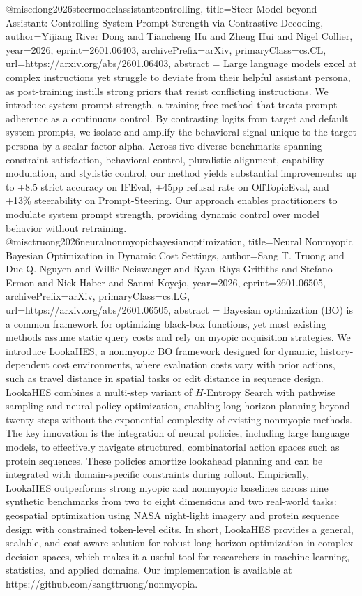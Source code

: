 {}@misc{dong2026steermodelassistantcontrolling,
      title={Steer Model beyond Assistant: Controlling System Prompt Strength via Contrastive Decoding}, 
      author={Yijiang River Dong and Tiancheng Hu and Zheng Hui and Nigel Collier},
      year={2026},
      eprint={2601.06403},
      archivePrefix={arXiv},
      primaryClass={cs.CL},
      url={https://arxiv.org/abs/2601.06403},
      abstract = {Large language models excel at complex instructions yet struggle to deviate from their helpful assistant persona, as post-training instills strong priors that resist conflicting instructions. We introduce system prompt strength, a training-free method that treats prompt adherence as a continuous control. By contrasting logits from target and default system prompts, we isolate and amplify the behavioral signal unique to the target persona by a scalar factor alpha. Across five diverse benchmarks spanning constraint satisfaction, behavioral control, pluralistic alignment, capability modulation, and stylistic control, our method yields substantial improvements: up to +8.5 strict accuracy on IFEval, +45pp refusal rate on OffTopicEval, and +13\% steerability on Prompt-Steering. Our approach enables practitioners to modulate system prompt strength, providing dynamic control over model behavior without retraining.}
}@misc{truong2026neuralnonmyopicbayesianoptimization,
      title={Neural Nonmyopic Bayesian Optimization in Dynamic Cost Settings}, 
      author={Sang T. Truong and Duc Q. Nguyen and Willie Neiswanger and Ryan-Rhys Griffiths and Stefano Ermon and Nick Haber and Sanmi Koyejo},
      year={2026},
      eprint={2601.06505},
      archivePrefix={arXiv},
      primaryClass={cs.LG},
      url={https://arxiv.org/abs/2601.06505},
      abstract = {Bayesian optimization (BO) is a common framework for optimizing black-box functions, yet most existing methods assume static query costs and rely on myopic acquisition strategies. We introduce LookaHES, a nonmyopic BO framework designed for dynamic, history-dependent cost environments, where evaluation costs vary with prior actions, such as travel distance in spatial tasks or edit distance in sequence design. LookaHES combines a multi-step variant of $H$-Entropy Search with pathwise sampling and neural policy optimization, enabling long-horizon planning beyond twenty steps without the exponential complexity of existing nonmyopic methods. The key innovation is the integration of neural policies, including large language models, to effectively navigate structured, combinatorial action spaces such as protein sequences. These policies amortize lookahead planning and can be integrated with domain-specific constraints during rollout. Empirically, LookaHES outperforms strong myopic and nonmyopic baselines across nine synthetic benchmarks from two to eight dimensions and two real-world tasks: geospatial optimization using NASA night-light imagery and protein sequence design with constrained token-level edits. In short, LookaHES provides a general, scalable, and cost-aware solution for robust long-horizon optimization in complex decision spaces, which makes it a useful tool for researchers in machine learning, statistics, and applied domains. Our implementation is available at https://github.com/sangttruong/nonmyopia.}
}
